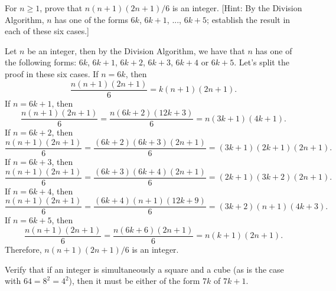 \begin{exercise}
    For $n \geq 1$, prove that $n(n+1)(2n+1)/6$ is an integer. [Hint: By the Division Algorithm, $n$ has one of the forms $6k$, $6k + 1$, ..., $6k+5$; establish the result in each of these six cases.] \\
\end{exercise}

\begin{solution}
    Let $n$ be an integer, then by the Division Algorithm, we have that $n$ has one of the following forms: $6k$, $6k+1$, $6k+2$, $6k+3$, $6k+4$ or $6k+5$. Let's split the proof in these six cases. If $n = 6k$, then
    $$\frac{n(n+1)(2n+1)}{6} = k(n+1)(2n+1).$$
    If $n = 6k+1$, then
    $$\frac{n(n+1)(2n+1)}{6} = \frac{n(6k+2)(12k+3)}{6} = n(3k+1)(4k+1).$$
    If $n = 6k+2$, then
    $$\frac{n(n+1)(2n+1)}{6} = \frac{(6k+2)(6k+3)(2n+1)}{6} = (3k+1)(2k+1)(2n+1).$$
    If $n = 6k+3$, then
    $$\frac{n(n+1)(2n+1)}{6} = \frac{(6k+3)(6k+4)(2n+1)}{6} = (2k+1)(3k+2)(2n+1).$$
    If $n = 6k+4$, then
    $$\frac{n(n+1)(2n+1)}{6} = \frac{(6k+4)(n+1)(12k+9)}{6} = (3k+2)(n+1)(4k+3).$$
    If $n = 6k+5$, then
    $$\frac{n(n+1)(2n+1)}{6} = \frac{n(6k+6)(2n+1)}{6} = n(k+1)(2n+1).$$
    Therefore, $n(n+1)(2n+1)/6$ is an integer. \\
\end{solution}

\begin{exercise}
    Verify that if an integer is simultaneously a square and a cube (as is the case with $64 = 8^2 = 4^2$), then it must be either of the form $7k$ of $7k+1$.\\
\end{exercise}

